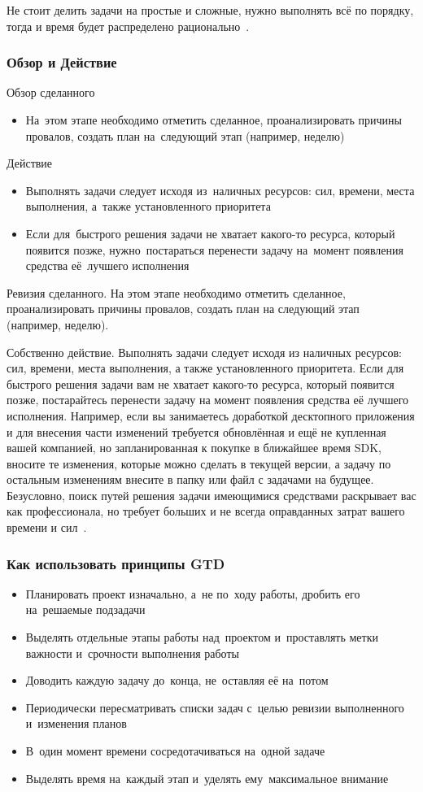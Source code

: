 \documentclass{../industrial-development}
\begin{document}
Не стоит делить задачи на простые и сложные, нужно выполнять всё по порядку, тогда и время будет распределено рационально~\cite{GTDHabr}. 

\begin{frame} \frametitle{Обзор и Действие}
Обзор сделанного
  \begin{itemize}
  \item На~этом этапе необходимо отметить сделанное, проанализировать причины провалов, создать план на~следующий этап (например, неделю)
  \end{itemize}
Действие
  \begin{itemize}
  \item Выполнять задачи следует исходя из~наличных ресурсов: сил, времени, места выполнения, а~также установленного приоритета
  \item Если для~быстрого решения задачи не хватает какого-то ресурса, который появится позже, нужно~постараться перенести задачу на~момент появления средства её~лучшего исполнения
  \end{itemize}
\end{frame}

\lecturenotes

Ревизия сделанного. На этом этапе необходимо отметить сделанное, проанализировать причины провалов, создать план на следующий этап (например, неделю).

Собственно действие. Выполнять задачи следует исходя из наличных ресурсов: сил, времени, места выполнения, а также установленного приоритета. Если для быстрого решения задачи вам не хватает какого-то ресурса, который появится позже, постарайтесь перенести задачу на момент появления средства её лучшего исполнения. Например, если вы занимаетесь доработкой десктопного приложения и для внесения части изменений требуется обновлённая и ещё не купленная вашей компанией, но запланированная к покупке в ближайшее время SDK, вносите те изменения, которые можно сделать в текущей версии, а задачу по остальным изменениям внесите в папку или файл с задачами на будущее. Безусловно, поиск путей решения задачи имеющимися средствами раскрывает вас как профессионала, но требует больших и не всегда оправданных затрат вашего времени и сил~\cite{GTDHabr}.

\begin{frame} \frametitle{Как использовать принципы GTD}
  \begin{itemize}
  \item Планировать проект изначально, а~не по~ходу работы, дробить его на~решаемые подзадачи
  \item Выделять отдельные этапы работы над~проектом и~проставлять метки важности и~срочности выполнения работы
  \item Доводить каждую задачу до~конца, не~оставляя её на~потом
  \item Периодически пересматривать списки задач с~целью ревизии выполненного и~изменения планов
  \item В~один момент времени сосредотачиваться на~одной задаче
  \item Выделять время на~каждый этап и~уделять ему~максимальное внимание
  \end{itemize}
\end{frame}
\end{document}
